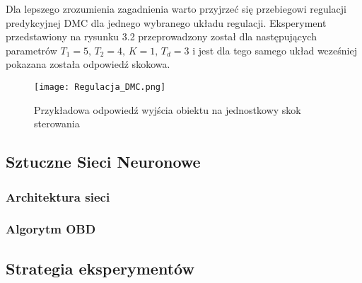 \par Dla lepszego zrozumienia zagadnienia warto przyjrzeć się przebiegowi regulacji predykcyjnej DMC dla jednego wybranego układu regulacji. Eksperyment przedstawiony na rysunku 3.2 przeprowadzony został dla następujących parametrów \( T_1=5, \, T_2=4, \, K=1, \, T_d=3 \) i jest dla tego samego układ wcześniej pokazana została odpowiedź skokowa.  

\begin{figure}[!h]
    \label{fig:Regulacja-DMC}
    \centering \texttt{[image: Regulacja\_DMC.png]}
    \caption{Przykładowa odpowiedź wyjścia obiektu na jednostkowy skok sterowania}
\end{figure}

\subsection{Sztuczne Sieci Neuronowe}


\subsubsection{Architektura sieci}

\subsubsection{Algorytm OBD}

\subsection{Strategia eksperymentów}

